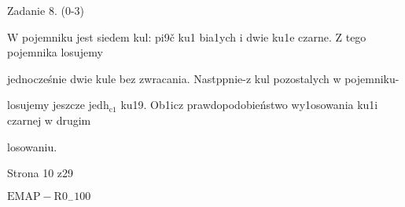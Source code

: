 \documentclass[a4paper,12pt]{article}
\begin{document}
Zadanie 8. (0-3)

$\mathrm{W}$ pojemniku jest siedem kul: pi9č ku1 bia1ych i dwie ku1e czarne. $\mathrm{Z}$ tego pojemnika losujemy

jednocześnie dwie kule bez zwracania. Nastppnie-z kul pozostalych w pojemniku-

losujemy jeszcze $\mathrm{j}\mathrm{e}\mathrm{d}\mathrm{h}_{\mathrm{c}1}$ ku19. Ob1icz prawdopodobieństwo wy1osowania ku1i czarnej w drugim

losowaniu.

Strona 10 z29

$\mathrm{E}\mathrm{M}\mathrm{A}\mathrm{P}-\mathrm{R}0_{-}100$
\end{document}
